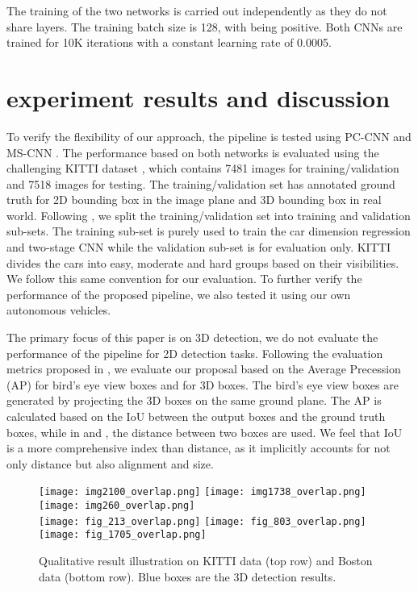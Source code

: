 \documentclass[letterpaper, 10 pt, conference]{ieeeconf}  \usepackage[
\begin{document}
The training of the two networks is carried out independently as they do not share layers. The training batch size is 128, with  being positive. Both CNNs are trained for 10K iterations with a constant learning rate of 0.0005.

\section{experiment results and discussion}
\label{sec:experiment results and discussion}
To verify the flexibility of our approach, the pipeline is tested using PC-CNN \cite{du2017iros} and MS-CNN \cite{cai2016unified}. The performance based on both networks is evaluated using the challenging KITTI dataset \cite{Geiger2012CVPR}, which contains 7481 images for training/validation and 7518 images for testing. The training/validation set has annotated ground truth for 2D bounding box in the image plane and 3D bounding box in real world. Following \cite{chen20153d}, we split the training/validation set into training and validation sub-sets. The training sub-set is purely used to train the car dimension regression and two-stage CNN while the validation sub-set is for evaluation only. KITTI divides the cars into easy, moderate and hard groups based on their visibilities. We follow this same convention for our evaluation. To further verify the performance of the proposed pipeline, we also tested it using our own autonomous vehicles.

 The primary focus of this paper is on 3D detection, we do not evaluate the performance of the pipeline for 2D detection tasks. Following the evaluation metrics proposed in \cite{Chen2017CVPR}, we evaluate our proposal based on the Average Precession (AP) for bird's eye view boxes and for 3D boxes. The bird's eye view boxes are generated by projecting the 3D boxes on the same ground plane. The AP is calculated based on the IoU between the output boxes and the ground truth boxes, while in \cite{xiang2015data} and \cite{deepmanta_cvpr17}, the distance between two boxes are used. We feel that IoU is a more comprehensive index than distance, as it implicitly accounts for not only distance but also alignment and size.

\begin{figure*}[t]
\centering
     \texttt{[image: img2100\_overlap.png]} 
     \texttt{[image: img1738\_overlap.png]}
     \texttt{[image: img260\_overlap.png]}  \\
     \texttt{[image: fig\_213\_overlap.png]} 
     \texttt{[image: fig\_803\_overlap.png]} 
     \texttt{[image: fig\_1705\_overlap.png]} 
    \caption{Qualitative result illustration on KITTI data (top row) and Boston data (bottom row). Blue boxes are the 3D detection results.}
    \label{fig:qualitative results}
\end{figure*}
\end{document}
